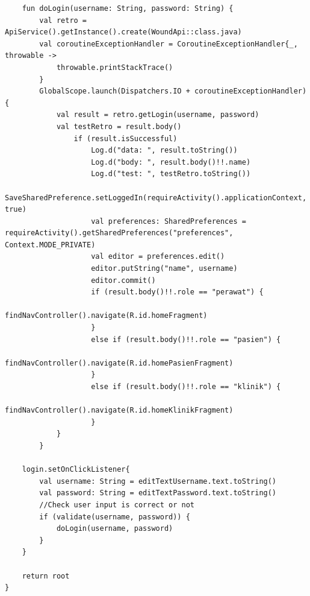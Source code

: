 \begin{enumerate}
\begin{lstlisting}
	fun doLogin(username: String, password: String) {
		val retro = ApiService().getInstance().create(WoundApi::class.java)
		val coroutineExceptionHandler = CoroutineExceptionHandler{_, throwable ->
			throwable.printStackTrace()
		}
		GlobalScope.launch(Dispatchers.IO + coroutineExceptionHandler) {
			val result = retro.getLogin(username, password)
			val testRetro = result.body()
				if (result.isSuccessful)
					Log.d("data: ", result.toString())
					Log.d("body: ", result.body()!!.name)
					Log.d("test: ", testRetro.toString())
					SaveSharedPreference.setLoggedIn(requireActivity().applicationContext, true)
					val preferences: SharedPreferences = requireActivity().getSharedPreferences("preferences", Context.MODE_PRIVATE)
					val editor = preferences.edit()
					editor.putString("name", username)
					editor.commit()
					if (result.body()!!.role == "perawat") {
						findNavController().navigate(R.id.homeFragment)
					}
					else if (result.body()!!.role == "pasien") {
						findNavController().navigate(R.id.homePasienFragment)
					}
					else if (result.body()!!.role == "klinik") {
						findNavController().navigate(R.id.homeKlinikFragment)
					}
			}
		}

	login.setOnClickListener{
		val username: String = editTextUsername.text.toString()
		val password: String = editTextPassword.text.toString()
		//Check user input is correct or not
		if (validate(username, password)) {
			doLogin(username, password)
		}
	}

	return root
}
	\end{lstlisting}
	

\end{enumerate}
